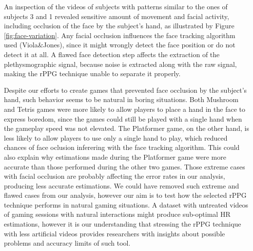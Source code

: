 An inspection of the videos of subjects with patterns similar to the ones of subjects 3 and 1 revealed sensitive amount of movement and facial activity, including occlusion of the face by the subject's hand, as illustrated by Figure \ref{fig:face-variation}. Any facial occlusion influences the face tracking algorithm used (Viola\&Jones), since it might wrongly detect the face position or do not detect it at all. A flawed face detection step affects the extraction of the plethysmographic signal, because noise is extracted along with the raw signal, making the rPPG technique unable to separate it properly.

Despite our efforts to create games that prevented face occlusion by the subject's hand, such behavior seems to be natural in boring situations. Both Mushroom and Tetris games were more likely to allow players to place a hand in the face to express boredom, since the games could still be played with a single hand when the gameplay speed was not elevated. The Platformer game, on the other hand, is less likely to allow players to use only a single hand to play, which reduced chances of face oclusion inferering with the face tracking algorithm. This could also explain why estimations made during the Platformer game were more accurate than those performed during the other two games. Those extreme cases with facial occlusion are probably affecting the error rates in our analysis, producing less accurate estimations. We could have removed such extreme and flawed cases from our analysis, however our aim is to test how the selected rPPG technique performs in natural gaming situations. A dataset with untreated videos of gaming sessions with natural interactions might produce sub-optimal HR estimations, however it is our understanding that stressing the rPPG technique with less artificial videos provides researchers with insights about possible problems and accuracy limits of such tool.

